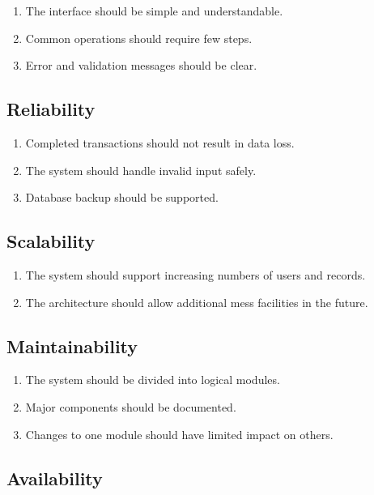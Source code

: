 \documentclass[12pt,a4paper]{report}
\begin{document}
	\begin{enumerate}[leftmargin=*]
		\item The interface should be simple and understandable.
		\item Common operations should require few steps.
		\item Error and validation messages should be clear.
	\end{enumerate}
	
	\subsection{Reliability}
	
	\begin{enumerate}[leftmargin=*]
		\item Completed transactions should not result in data loss.
		\item The system should handle invalid input safely.
		\item Database backup should be supported.
	\end{enumerate}
	
	\subsection{Scalability}
	
	\begin{enumerate}[leftmargin=*]
		\item The system should support increasing numbers of users and records.
		\item The architecture should allow additional mess facilities in the future.
	\end{enumerate}
	
	\subsection{Maintainability}
	
	\begin{enumerate}[leftmargin=*]
		\item The system should be divided into logical modules.
		\item Major components should be documented.
		\item Changes to one module should have limited impact on others.
	\end{enumerate}
	
	\subsection{Availability}
	
\end{document}
